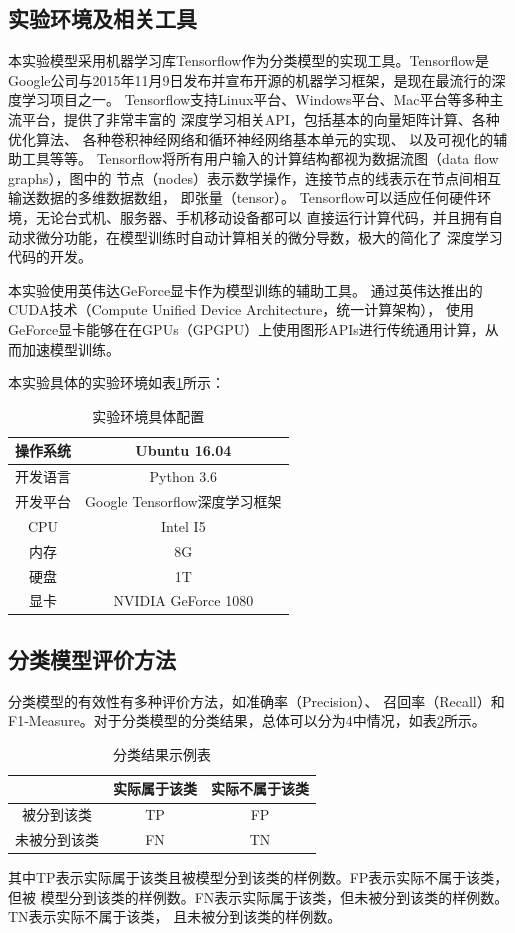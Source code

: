 \subsection{实验环境及相关工具}
本实验模型采用机器学习库Tensorflow作为分类模型的实现工具。Tensorflow是
Google公司与2015年11月9日发布并宣布开源的机器学习框架，是现在最流行的深度学习项目之一。
Tensorflow支持Linux平台、Windows平台、Mac平台等多种主流平台，提供了非常丰富的
深度学习相关API，包括基本的向量矩阵计算、各种优化算法、
各种卷积神经网络和循环神经网络基本单元的实现、
以及可视化的辅助工具等等。
Tensorflow将所有用户输入的计算结构都视为数据流图（data flow graphs），图中的
节点（nodes）表示数学操作，连接节点的线表示在节点间相互输送数据的多维数据数组，
即张量（tensor）。
Tensorflow可以适应任何硬件环境，无论台式机、服务器、手机移动设备都可以
直接运行计算代码，并且拥有自动求微分功能，在模型训练时自动计算相关的微分导数，极大的简化了
深度学习代码的开发。

本实验使用英伟达GeForce显卡作为模型训练的辅助工具。
通过英伟达推出的CUDA技术（Compute Unified Device Architecture，统一计算架构），
使用GeForce显卡能够在在GPUs（GPGPU）上使用图形APIs进行传统通用计算，从而加速模型训练。

本实验具体的实验环境如表\ref{train_env_table}所示：
\begin{table}[h]
    \caption{实验环境具体配置}
    \begin{tabular}{|c|c|}
        \hline
        操作系统 & Ubuntu 16.04 \\
        \hline
        开发语言 & Python 3.6 \\
        \hline
        开发平台 & Google Tensorflow深度学习框架 \\
        \hline
        CPU & Intel I5 \\
        \hline
        内存 & 8G \\
        \hline
        硬盘 & 1T \\
        \hline
        显卡 & NVIDIA GeForce 1080 \\
        \hline
    \end{tabular}
    \label{train_env_table}
\end{table}
\subsection{分类模型评价方法}
\label{test_fun}
分类模型的有效性有多种评价方法，如准确率（Precision）、
召回率（Recall）和F1-Measure。对于分类模型的分类结果，总体可以分为4中情况，如表\ref{classification_demo_table}所示。
\begin{table}[h]
    \caption{分类结果示例表}
    \begin{tabular}{|c|c|c|}
        \hline
        & 实际属于该类 & 实际不属于该类 \\
        \hline
        被分到该类 & TP & FP \\
        \hline
        未被分到该类 & FN & TN \\
        \hline
    \end{tabular}
    \label{classification_demo_table}
\end{table}
其中TP表示实际属于该类且被模型分到该类的样例数。FP表示实际不属于该类，但被
模型分到该类的样例数。FN表示实际属于该类，但未被分到该类的样例数。TN表示实际不属于该类，
且未被分到该类的样例数。

